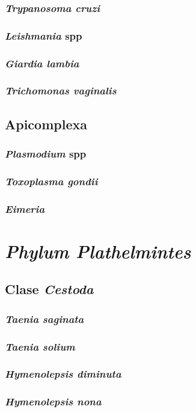 \documentclass[10pt,a4paper,onecolumn,openany]{book}
\begin{document}
\subsection{\textit{Trypanosoma cruzi}}
\subsection{\textit{Leishmania} spp}
\subsection{\textit{Giardia lambia}}
\subsection{\textit{Trichomonas vaginalis}}
\section{Apicomplexa}
\subsection{\textit{Plasmodium} spp}
\subsection{\textit{Toxoplasma gondii}}
\subsection{\textit{Eimeria}}
\chapter{\textit{Phylum Plathelmintes}}
\section{Clase \textit{Cestoda}}
\subsection{\textit{Taenia saginata}}
\subsection{\textit{Taenia solium}}
\subsection{\textit{Hymenolepsis diminuta}}
\subsection{\textit{Hymenolepsis nona}}
\end{document}
